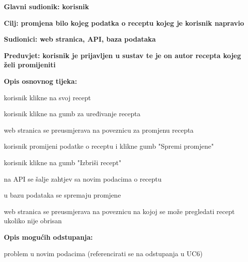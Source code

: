 					\noindent {}
					\begin{packed_item}
						\item \textbf{Glavni sudionik: korisnik}
						\item  \textbf{Cilj: promjena bilo kojeg podatka o receptu kojeg je korisnik napravio}
						\item  \textbf{Sudionici: web stranica, API, baza podataka}
						\item  \textbf{Preduvjet: korisnik je prijavljen u sustav te je on autor recepta kojeg želi promijeniti}
						
						\item  \textbf{Opis osnovnog tijeka:}
						\item[] \begin{packed_enum}
							\item korisnik klikne na svoj recept
							\item korisnik klikne na gumb za uređivanje recepta
							\item web stranica se preusmjerava na poveznicu za promjenu recepta
							\item[7.a] korisnik promijeni podatke o receptu i klikne gumb "Spremi promjene"
							\item[7.b] korisnik klikne na gumb "Izbriši recept"
							\item na API se šalje zahtjev sa novim podacima o receptu
							\item u bazu podataka se spremaju promjene
							\item web stranica se preusmjerava na poveznicu na kojoj se može pregledati recept ukoliko nije obrisan
						\end{packed_enum}
						
						\item  \textbf{Opis mogućih odstupanja:}
						\item[] \begin{packed_item}							
							\item[7.c] problem u novim podacima (referencirati se na odstupanja u UC6)
						\end{packed_item}
					\end{packed_item}




